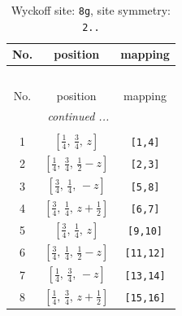 \documentclass[fleqn,8pt]{jsarticle}
\begin{document}
\renewcommand{\arraystretch}{1.2}
\begin{longtable}{ccc}
\caption{Wyckoff site: {\tt 8g}, site symmetry: {\tt 2..}}
 \\
 \hline \hline
No. & position & mapping \\ \hline \endfirsthead

\multicolumn{2}{l}{\tablename\ \thetable{}} \\
 \hline \hline
No. & position & mapping \\ \hline \endhead

 \hline \hline
\multicolumn{2}{r}{\footnotesize\it continued ...} \\ \endfoot

 \hline \hline
\multicolumn{2}{r}{} \\ \endlastfoot

1 & $\left[ \frac{1}{4},\, \frac{3}{4},\, z \right]$ & {\tt [1,4]} \\ \hline
2 & $\left[ \frac{1}{4},\, \frac{3}{4},\, \frac{1}{2} - z \right]$ & {\tt [2,3]} \\ \hline
3 & $\left[ \frac{3}{4},\, \frac{1}{4},\, - z \right]$ & {\tt [5,8]} \\ \hline
4 & $\left[ \frac{3}{4},\, \frac{1}{4},\, z + \frac{1}{2} \right]$ & {\tt [6,7]} \\ \hline
5 & $\left[ \frac{3}{4},\, \frac{1}{4},\, z \right]$ & {\tt [9,10]} \\ \hline
6 & $\left[ \frac{3}{4},\, \frac{1}{4},\, \frac{1}{2} - z \right]$ & {\tt [11,12]} \\ \hline
7 & $\left[ \frac{1}{4},\, \frac{3}{4},\, - z \right]$ & {\tt [13,14]} \\ \hline
8 & $\left[ \frac{1}{4},\, \frac{3}{4},\, z + \frac{1}{2} \right]$ & {\tt [15,16]} \\
\end{longtable}
\renewcommand{\arraystretch}{1.2}
\end{document}
